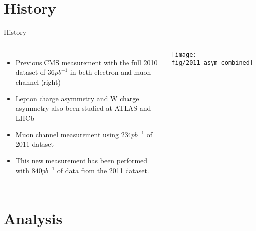 \documentclass[t, 8pt]{beamer}
\begin{document}
\section{History}

\begin{frame}{History}
  \begin{columns}[c]
  \begin{itemize}
    \item Previous CMS measurement with the full 2010 dataset of $36 pb^{-1}$ in both electron and muon channel (right)
    \item Lepton charge asymmetry and W charge asymmetry also been studied at ATLAS and LHCb
    \item Muon channel measurement using $234pb^{-1}$ of 2011 dataset
    \vspace{1cm}
    \item This new measurement has been performed with $840pb^{-1}$ of data from the 2011 dataset.
  \end{itemize}
    \texttt{[image: fig/2011\_asym\_combined]}
  \end{columns}
\end{frame}






\section{Analysis}
\end{document}
